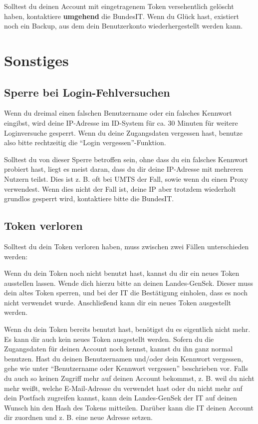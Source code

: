 Solltest du deinen Account mit eingetragenem Token versehentlich gelöscht haben, kontaktiere \textbf{umgehend} die BundesIT.
Wenn du Glück hast, existiert noch ein Backup, aus dem dein Benutzerkonto wiederhergestellt werden kann.


\newpage
\section{Sonstiges}
\subsection{Sperre bei Login-Fehlversuchen}
Wenn du dreimal einen falschen Benutzername oder ein falsches Kennwort eingibst,
wird deine IP-Adresse im ID-System für ca. 30 Minuten für weitere Loginversuche gesperrt.
Wenn du deine Zugangsdaten vergessen hast, benutze also bitte rechtzeitig die "`Login vergessen"'-Funktion.

Solltest du von dieser Sperre betroffen sein, ohne dass du ein falsches Kennwort probiert hast,
liegt es meist daran, dass du dir deine IP-Adresse mit mehreren Nutzern teilst.
Dies ist z. B. oft bei UMTS der Fall, sowie wenn du einen Proxy verwendest.
Wenn dies nicht der Fall ist, deine IP aber trotzdem wiederholt grundlos gesperrt wird,
kontaktiere bitte die BundesIT.

\subsection{Token verloren}
Solltest du dein Token verloren haben, muss zwischen zwei Fällen unterschieden werden:

Wenn du dein Token noch nicht benutzt hast, kannst du dir ein neues Token ausstellen lassen.
Wende dich hierzu bitte an deinen Landes-GenSek. Dieser muss dein altes Token sperren,
und bei der IT die Bestätigung einholen, dass es noch nicht verwendet wurde.
Anschließend kann dir ein neues Token ausgestellt werden.

Wenn du dein Token bereits benutzt hast, benötigst du es eigentlich nicht mehr.
Es kann dir auch kein neues Token ausgestellt werden.
Sofern du die Zugangsdaten für deinen Account noch kennst, kannst du ihn ganz normal benutzen.
Hast du deinen Benutzernamen und/oder dein Kennwort vergessen, gehe wie unter "`Benutzername oder Kennwort vergessen"' beschrieben vor.
Falls du auch so keinen Zugriff mehr auf deinen Account bekommst,
z. B. weil du nicht mehr weißt, welche E-Mail-Adresse du verwendet hast oder du nicht mehr auf dein Postfach zugreifen kannst,
kann dein Landes-GenSek der IT auf deinen Wunsch hin den Hash des Tokens mitteilen.
Darüber kann die IT deinen Account dir zuordnen und z. B. eine neue Adresse setzen.

